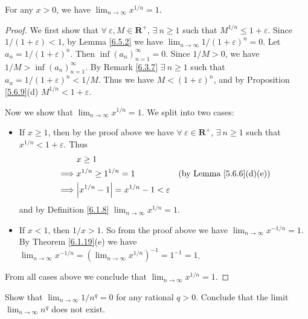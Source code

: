 \begin{lemma}\label{6.5.3}
    For any \(x > 0\), we have \(\lim_{n \to \infty} x^{1 / n} = 1\).
\end{lemma}

\begin{proof}
    We first show that \(\forall\ \varepsilon, M \in \mathbf{R}^+\), \(\exists\ n \geq 1\) such that \(M^{1 / n} \leq 1 + \varepsilon\).
    Since \(1 / (1 + \varepsilon) < 1\), by Lemma \ref{6.5.2} we have \(\lim_{n \to \infty} 1 / (1 + \varepsilon)^n = 0\).
    Let \(a_n = 1 / (1 + \varepsilon)^n\).
    Then \(\inf(a_n)_{n = 1}^\infty = 0\).
    Since \(1 / M > 0\), we have \(1 / M > \inf(a_n)_{n = 1}^\infty\).
    By Remark \ref{6.3.7} \(\exists\ n \geq 1\) such that \(a_n = 1 / (1 + \varepsilon)^n < 1 / M\).
    Thus we have \(M < (1 + \varepsilon)^n\), and by Proposition \ref{5.6.9}(d) \(M^{1 / n} < 1 + \varepsilon\).

    Now we show that \(\lim_{n \to \infty} x^{1 / n} = 1\).
    We split into two cases:
    \begin{itemize}
        \item If \(x \geq 1\), then by the proof above we have \(\forall\ \varepsilon \in \mathbf{R}^+\), \(\exists\ n \geq 1\) such that \(x^{1 / n} < 1 + \varepsilon\).
              Thus
              \begin{align*}
                           & x \geq 1                                                                                 \\
                  \implies & x^{1 / n} \geq 1^{1 / n} = 1                       & \text{(by Lemma \ref{5.6.6}(d)(e))} \\
                  \implies & \abs*{x^{1 / n} - 1} = x^{1 / n} - 1 < \varepsilon
              \end{align*}
              and by Definition \ref{6.1.8} \(\lim_{n \to \infty} x^{1 / n} = 1\).
        \item If \(x < 1\), then \(1 / x > 1\).
              So from the proof above we have \(\lim_{n \to \infty} x^{-1 / n} = 1\).
              By Theorem \ref{6.1.19}(e) we have \(\lim_{n \to \infty} x^{-1 / n} = (\lim_{n \to \infty} x^{1 / n})^{-1} = 1^{-1} = 1\).
    \end{itemize}
    From all cases above we conclude that \(\lim_{n \to \infty} x^{1 / n} = 1\).
\end{proof}

\exercisesection

\begin{exercise}\label{ex 6.5.1}
    Show that \(\lim_{n \to \infty} 1 / n^q = 0\) for any rational \(q > 0\).
    Conclude that the limit \(\lim_{n \to \infty} n^q\) does not exist.
\end{exercise}

